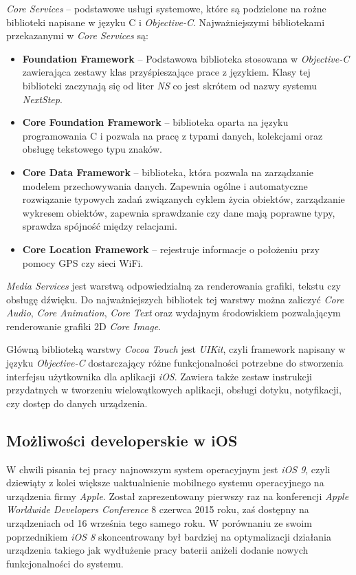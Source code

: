 \documentclass{iiuwb}
\begin{document}
\textit{Core Services} -- podstawowe usługi systemowe, które są podzielone na rożne biblioteki napisane w języku C i \textit{Objective-C}. Najważniejszymi bibliotekami przekazanymi w \textit{Core Services} są:
\begin{itemize}
\item \textbf{Foundation Framework} -- Podstawowa biblioteka stosowana w \textit{Objective-C} zawierająca zestawy klas przyśpieszające prace z językiem. Klasy tej biblioteki zaczynają się od liter \textit{NS} co jest skrótem od nazwy systemu \textit{NextStep}.
\item \textbf{Core Foundation Framework} -- biblioteka oparta na języku programowania C i pozwala na pracę z typami danych, kolekcjami oraz obsługę tekstowego typu znaków.
\item \textbf{Core Data Framework} -- biblioteka, która pozwala na zarządzanie modelem przechowywania danych. Zapewnia ogólne i automatyczne rozwiązanie typowych zadań związanych cyklem życia obiektów, zarządzanie wykresem obiektów, zapewnia sprawdzanie czy dane mają poprawne typy, sprawdza spójność między relacjami.
\item \textbf{Core Location Framework} -- rejestruje informacje o położeniu przy pomocy GPS czy sieci WiFi.
\end{itemize} 
\textit{Media Services} jest warstwą odpowiedzialną za renderowania grafiki, tekstu czy obsługę dźwięku. Do najważniejszych bibliotek tej warstwy można zaliczyć \textit{Core Audio}, \textit{Core Animation}, \textit{Core Text} oraz wydajnym środowiskiem pozwalającym renderowanie grafiki 2D \textit{Core Image}.

Główną biblioteką warstwy \textit{Cocoa Touch} jest \textit{UIKit}, czyli framework napisany w języku \textit{Objective-C} dostarczający różne funkcjonalności potrzebne do stworzenia interfejsu użytkownika dla aplikacji \textit{iOS}. Zawiera także zestaw instrukcji przydatnych w tworzeniu wielowątkowych aplikacji, obsługi dotyku, notyfikacji, czy dostęp do danych urządzenia.

\subsection{Możliwości developerskie w iOS}
W chwili pisania tej pracy najnowszym system operacyjnym jest \textit{iOS 9}, czyli dziewiąty z kolei większe uaktualnienie mobilnego systemu operacyjnego na urządzenia firmy \textit{Apple}. Został zaprezentowany pierwszy raz na konferencji \textit{Apple Worldwide Developers Conference} 8 czerwca  2015 roku, zaś dostępny na urządzeniach od 16 września tego samego roku. W porównaniu ze swoim poprzednikiem \textit{iOS 8} skoncentrowany był bardziej na optymalizacji działania urządzenia takiego jak wydłużenie pracy baterii aniżeli dodanie nowych funkcjonalności do systemu. 
\end{document}
